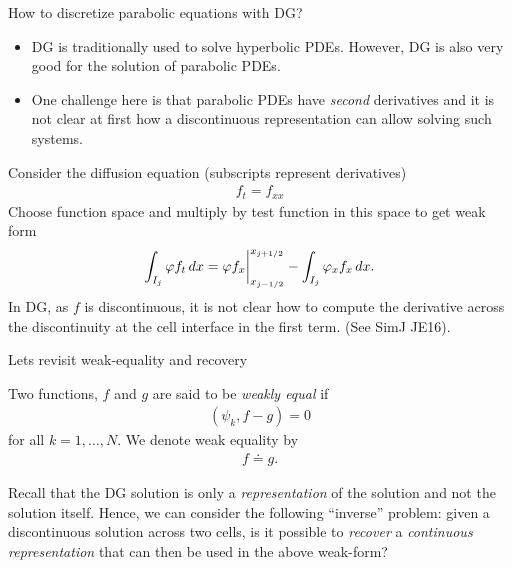 \documentclass[aspectratio=169]{beamer}
\begin{document}
\begin{frame}{How to discretize parabolic equations with DG?}
  \footnotesize%
  \begin{itemize}
  \item DG is traditionally used to solve hyperbolic PDEs. However, DG is
    also very good for the solution of parabolic PDEs.
  \item One challenge here is that parabolic PDEs have \emph{second}
    derivatives and it is not clear at first how a discontinuous
    representation can allow solving such systems.
  \end{itemize}
  Consider the diffusion equation (subscripts represent derivatives)
  \begin{align*}
    f_t = f_{xx}
  \end{align*}
  Choose function space and multiply by test function in this space to
  get weak form
  \begin{align*}
    \int_{I_j} \varphi f_t \thinspace dx =   \varphi f_x \bigg|^{x_{j+1/2}}_{x_{j-1/2}}
    -
    \int_{I_j} \varphi_{x} f_x \thinspace dx.
  \end{align*}
  In DG, as $f$ is discontinuous, it is not clear how to compute the
  derivative across the discontinuity at the cell interface in the
  first term. (See SimJ JE16).
  
\end{frame}


\begin{frame}{Lets revisit weak-equality and recovery}
  \begin{definition}
    Two functions, $f$ and $g$ are said to be \emph{weakly equal} if
    \begin{align*}
      (\psi_k,f-g) = 0
    \end{align*}
    for all $k=1,\ldots,N$. We denote weak equality by
    \begin{align*}
      f \doteq g.
    \end{align*}
  \end{definition}
  Recall that the DG solution is only a \emph{representation} of the
  solution and not the solution itself. Hence, we can consider the
  following ``inverse'' problem: given a discontinuous solution across
  two cells, is it possible to \emph{recover} a \emph{continuous
    representation} that can then be used in the above weak-form?
\end{frame}
\end{document}
